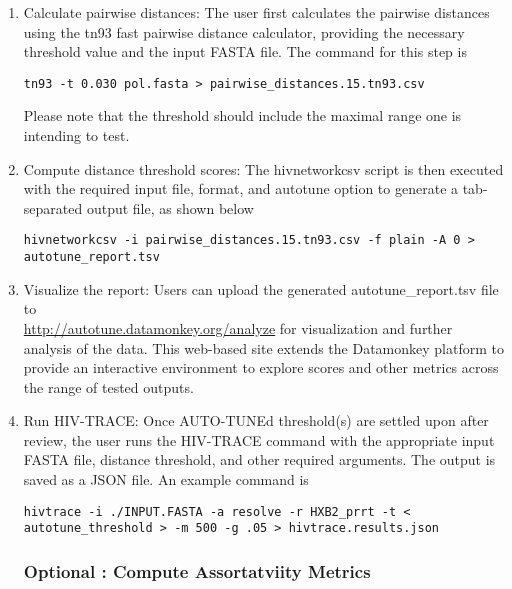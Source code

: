 \documentclass[utf8]{FrontiersinHarvard} %
\begin{document}
\begin{enumerate}

\item{ Calculate pairwise distances: The user first calculates the pairwise distances using the tn93 fast pairwise distance calculator, providing the necessary threshold value and the input FASTA file. The command for this step is 
\begin{lstlisting}[style=BashInputStyle]
 tn93 -t 0.030 pol.fasta > pairwise_distances.15.tn93.csv
\end{lstlisting}

Please note that the threshold should include the maximal range one is intending to test.

}

\item {Compute distance threshold scores: The hivnetworkcsv script is then executed with the required input file, format, and autotune option to generate a tab-separated output file, as shown below
\begin{lstlisting}[style=BashInputStyle]
 hivnetworkcsv -i pairwise_distances.15.tn93.csv -f plain -A 0 > autotune_report.tsv
\end{lstlisting}
}

\item {Visualize the report: Users can upload the generated autotune\_report.tsv file to \\
  \url{http://autotune.datamonkey.org/analyze} for visualization and further analysis of the data. This web-based site extends the Datamonkey platform \cite{weaver_datamonkey_2018} to provide an interactive environment to explore scores and other metrics across the range of tested outputs. }

\item {Run HIV-TRACE: Once AUTO-TUNEd threshold(s) are settled upon after review, the user runs the HIV-TRACE command with the appropriate input FASTA file, distance threshold, and other required arguments. The output is saved as a JSON file. An example command is
	\begin{lstlisting}[style=BashInputStyle]
hivtrace -i ./INPUT.FASTA -a resolve -r HXB2_prrt -t < autotune_threshold > -m 500 -g .05 > hivtrace.results.json
	\end{lstlisting}
}

\subsubsection{Optional : Compute Assortatviity Metrics}


\end{enumerate}
\end{document}
